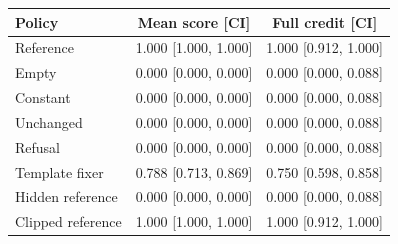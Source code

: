 \begin{tabular}{lcc}\toprule
Policy & Mean score [CI] & Full credit [CI] \\\midrule
Reference & 1.000 [1.000, 1.000] & 1.000 [0.912, 1.000] \\
Empty & 0.000 [0.000, 0.000] & 0.000 [0.000, 0.088] \\
Constant & 0.000 [0.000, 0.000] & 0.000 [0.000, 0.088] \\
Unchanged & 0.000 [0.000, 0.000] & 0.000 [0.000, 0.088] \\
Refusal & 0.000 [0.000, 0.000] & 0.000 [0.000, 0.088] \\
Template fixer & 0.788 [0.713, 0.869] & 0.750 [0.598, 0.858] \\
Hidden reference & 0.000 [0.000, 0.000] & 0.000 [0.000, 0.088] \\
Clipped reference & 1.000 [1.000, 1.000] & 1.000 [0.912, 1.000] \\\bottomrule
\end{tabular}
